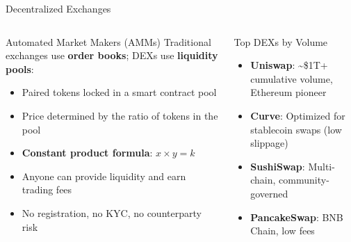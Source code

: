 \documentclass[8pt,aspectratio=169]{beamer}
\begin{document}
\begin{frame}{Decentralized Exchanges}
\begin{columns}[T]
\begin{block}{Automated Market Makers (AMMs)}
\footnotesize
Traditional exchanges use \textbf{order books}; DEXs use \textbf{liquidity pools}:
\begin{itemize}
  \item Paired tokens locked in a smart contract pool
  \item Price determined by the ratio of tokens in the pool
  \item \textbf{Constant product formula}: $x \times y = k$
  \item Anyone can provide liquidity and earn trading fees
  \item No registration, no KYC, no counterparty risk
\end{itemize}
\end{block}
\vspace{2mm}
\begin{exampleblock}{Top DEXs by Volume}
\footnotesize
\begin{itemize}
  \item \textbf{Uniswap}: \textasciitilde\$1T+ cumulative volume, Ethereum pioneer
  \item \textbf{Curve}: Optimized for stablecoin swaps (low slippage)
  \item \textbf{SushiSwap}: Multi-chain, community-governed
  \item \textbf{PancakeSwap}: BNB Chain, low fees
\end{itemize}
\end{exampleblock}

\centering
\vspace{2mm}
\end{columns}
\end{frame}
\end{document}
